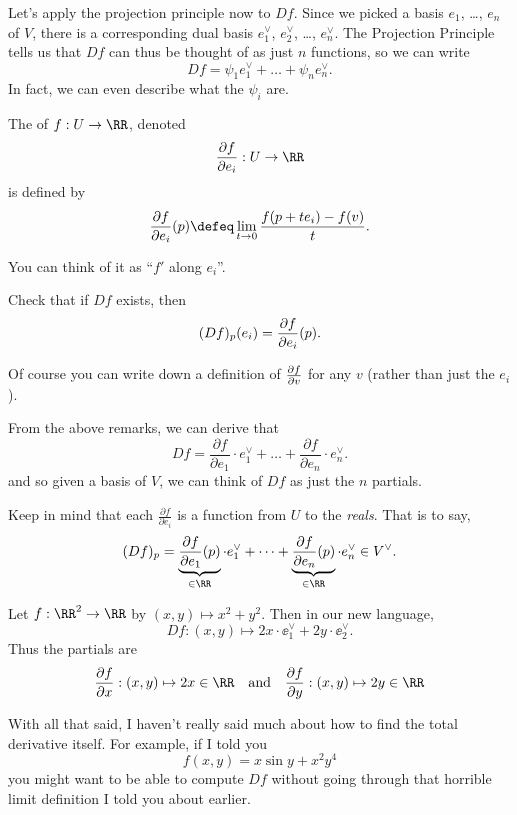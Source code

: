 \documentclass[11pt]{scrreprt}
\begin{document}
Let's apply the projection principle now to $Df$.
Since we picked a basis $e_1$, \dots, $e_n$ of $V$,
there is a corresponding dual basis
$e_1^\vee$, $e_2^\vee$, \dots, $e_n^\vee$.
The Projection Principle tells us that $Df$ can thus be thought of as just $n$ functions, so we can write
\[ Df = \psi_1 e_1^\vee + \dots + \psi_n e_n^\vee.  \]
In fact, we can even describe what the $\psi_i$ are.
\begin{definition}
	The  of $f : U \to \RR$, denoted 
	\[ \fpartial{f}{e_i}: U \to \RR \]
	is defined by
	\[
		\fpartial{f}{e_i} (p)
		\defeq \lim_{t \to 0} \frac{f(p + te_i) - f(v)}{t}.
	\]
\end{definition}
You can think of it as ``$f'$ along $e_i$''.
\begin{ques}
	Check that if $Df$ exists, then \[ (Df)_p(e_i) = \frac{\partial f}{\partial e_i}(p). \]
\end{ques}
\begin{remark}
	Of course you can write down a definition of $\frac{\partial f}{\partial v}$
	for any $v$ (rather than just the $e_i$).
\end{remark}

From the above remarks, we can derive that
\[
	\boxed{
	Df =
	\frac{\partial f}{\partial e_1} \cdot e_1^\vee
	+ \dots + 
	\frac{\partial f}{\partial e_n} \cdot e_n^\vee .
	}
\]
and so given a basis of $V$, we can think of $Df$ as just
the $n$ partials.
\begin{remark}
Keep in mind that each $\frac{\partial f}{\partial e_i}$ is a function from $U$ to the \emph{reals}.
That is to say,
\[
	(Df)_p =
	\underbrace{\frac{\partial f}{\partial e_1}(p)}_{\in \RR} \cdot e_1^\vee
	+ \dots + 
	\underbrace{\frac{\partial f}{\partial e_n}(p)}_{\in \RR} \cdot e_n^\vee
	\in V^\vee.
\]
\end{remark}


\begin{example}[Partial Derivatives of $f(x,y) = x^2+y^2$]
	Let $f : \RR^2 \to \RR$ by $(x,y) \mapsto x^2+y^2$.
	Then in our new language, 
	\[ Df : (x,y) \mapsto 2x \cdot \ee_1^\vee + 2y \cdot \ee_2^\vee. \]
	Thus the partials are
	\[
		\frac{\partial f}{\partial x} : (x,y) \mapsto 2x \in \RR
		\quad\text{and}\quad
		\frac{\partial f}{\partial y} : (x,y) \mapsto 2y \in \RR
	\]
\end{example}

With all that said, I haven't really said much about how to
find the total derivative itself.
For example, if I told you
\[ f(x,y) = x \sin y + x^2y^4 \]
you might want to be able to compute $Df$ without going through
that horrible limit definition I told you about earlier.
\end{document}
